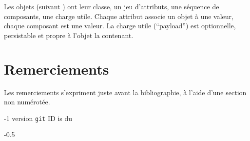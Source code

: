 \documentclass[french]{pfia}
\begin{document}
Les objets (suivant \cite{greiner:1980:representation,
  kay:1996:early-smalltalk, kumar:2015:importance-expert-systems,
  levene:2012:relational-databases}) ont leur classe, un jeu
d'attributs, une séquence de composants, une charge utile. Chaque
attribut associe un objet à une valeur, chaque composant est une
valeur. La charge utile (``payload'') est optionnelle, persistable et
propre à l'objet la contenant.
\smallskip
\section*{Remerciements}
Les remerciements s'expriment juste avant la bibliographie, à l'aide d'une section non numérotée.

\begin{flushright}
  \begin{relsize}{-1}
    version \texttt{git} ID is \texttt{\textit{\rpsgitcommit}} du
    \texttt{\textit{\rpsgitdate}}
  \end{relsize}
\end{flushright}


\begin{relsize}{-0.5}

\end{relsize}
\end{document}
